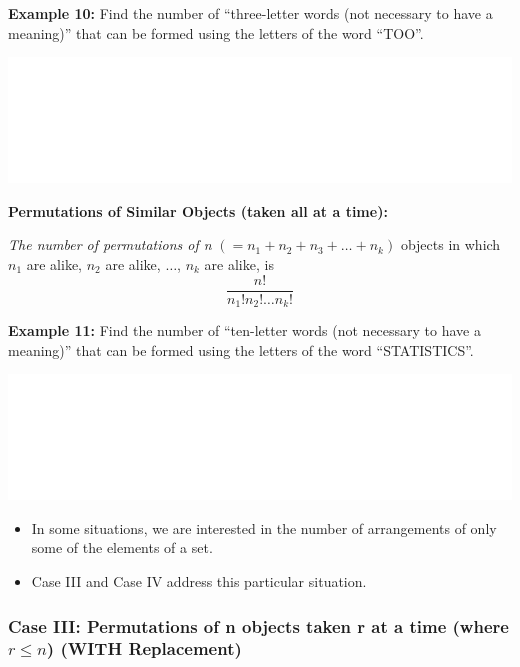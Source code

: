 \documentclass[]{book}
\providecommand{\tightlist}{%
  \setlength{\itemsep}{0pt}\setlength{\parskip}{0pt}}
\begin{document}
\textbf{Example 10:} Find the number of ``three-letter words (not necessary to have a meaning)'' that can be formed using the letters of the word ``TOO''.

\begin{center}\includegraphics[width=1\linewidth]{figure/box87-1} \end{center}

\textbf{Permutations of Similar Objects (taken all at a time):}

\emph{The number of permutations of n} \((=n_1 + n_2 + n_3 + \dots + n_k)\) objects in which \(n_1\) are alike, \(n_2\) are alike, \(\dots\), \(n_k\) are alike, is
\[\frac{n!}{n_1!n_2!\dots n_k!}\]

\textbf{Example 11:} Find the number of ``ten-letter words (not necessary to have a meaning)'' that can be formed using the letters of the word ``STATISTICS''.

\begin{center}\includegraphics[width=1\linewidth]{figure/box88-1} \end{center}

\begin{itemize}
\tightlist
\item
  In some situations, we are interested in the number of arrangements of only some of the elements of a set.
\item
  Case III and Case IV address this particular situation.
\end{itemize}

\hypertarget{case-iii-permutations-of-n-objects-taken-r-at-a-time-where-rleq-n-with-replacement}{%
\subsubsection{\texorpdfstring{Case III: Permutations of n objects taken r at a time (where \(r\leq n\)) (WITH Replacement)}{Case III: Permutations of n objects taken r at a time (where r\textbackslash{}leq n) (WITH Replacement)}}\label{case-iii-permutations-of-n-objects-taken-r-at-a-time-where-rleq-n-with-replacement}}
\end{document}
